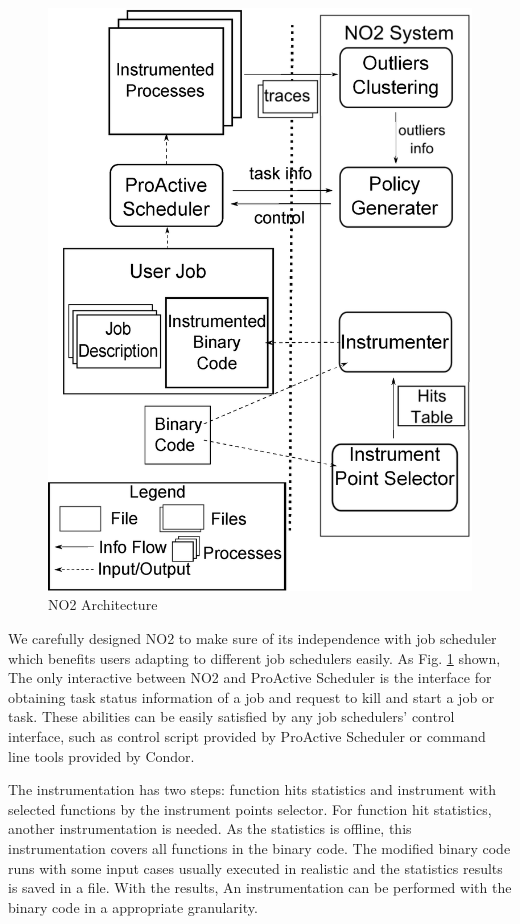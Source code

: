 \begin{figure}
\centering
\includegraphics[width=0.9\columnwidth]{figures/NO2_arch.eps}
\caption{NO2 Architecture}
\label{figure:no2arch}
\end{figure}

We carefully designed NO2 to make sure of its independence with job scheduler which benefits users adapting to different job schedulers easily. As Fig. \ref{figure:no2arch} shown, The only interactive between NO2 and ProActive Scheduler is the interface for obtaining task status information of a job and request to kill and start a job or task. These abilities can be easily satisfied by any job schedulers' control interface, such as control script provided by ProActive Scheduler or command line tools provided by Condor.

The instrumentation has two steps: function hits statistics and instrument with selected functions by the instrument points selector. For function hit statistics, another instrumentation is needed. As the statistics is offline, this instrumentation covers all functions in the binary code. The modified binary code runs with some input cases usually executed in realistic and the statistics results is saved in a file. With the results, An instrumentation can be performed with the binary code in a appropriate granularity.

